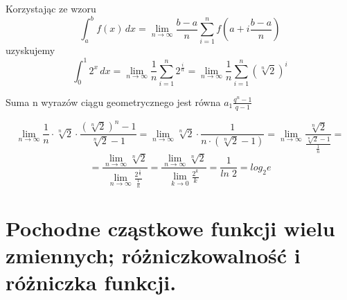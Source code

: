 \documentclass[12pt]{article}
\begin{document}
    Korzystając ze wzoru
    $$\int_a^b f(x) \,dx  = \lim_{n \rightarrow \infty} \frac{b - a}{n} \sum_{i =1}^{n} f(a + i\frac{b - a}{n}) $$
    uzyskujemy
    $$\int_0^1 2^x \,dx  = \lim_{n \rightarrow \infty} \frac{1}{n} \sum_{i =1}^{n} 2^{\frac{i}{n}} 
    = \lim_{n \rightarrow \infty} \frac{1}{n} \sum_{i =1}^{n} (\sqrt[n]{2})^i $$
    
    Suma n wyrazów ciągu geometrycznego jest równa $a_1 \frac{q^n - 1}{q - 1}$ 
    
    $$\lim_{n \rightarrow \infty} \frac{1}{n} \cdot \sqrt[n]{2} \cdot \frac{(\sqrt[n]{2})^n - 1}{\sqrt[n]{2} - 1} = 
    \lim_{n \rightarrow \infty} \sqrt[n]{2} \cdot \frac{1}{n \cdot (\sqrt[n]{2} - 1)} = 
    \lim_{n \rightarrow \infty} \frac{\sqrt[n]{2}}{\frac{\sqrt[n]{2} - 1}{\frac{1}{n}}} = $$
    $$= \frac{\lim_{n \rightarrow \infty} \sqrt[n]{2}}{\lim_{n \rightarrow \infty} \frac{2^{\frac{1}{n}}}{\frac{1}{n}}} =
    \frac{\lim_{n \rightarrow \infty} \sqrt[n]{2}}{\lim_{k \rightarrow 0} \frac{2^{k}}{k}} = 
    \frac{1}{ln\; 2} = log_2e$$ 
    \newpage

    \section{Pochodne cząstkowe funkcji wielu zmiennych; różniczkowalność i różniczka funkcji.}
\end{document}
